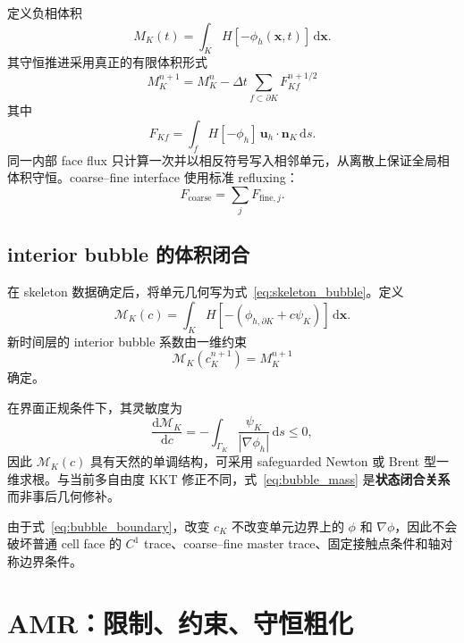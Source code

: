 \documentclass[11pt,a4paper]{ctexart}
\newcommand{\dd}{\mathrm{d}}
\newcommand{\bx}{\bm{x}}
\newcommand{\bu}{\bm{u}}
\newcommand{\bn}{\bm{n}}
\newcommand{\grad}{\nabla}
\begin{document}
定义负相体积
\begin{equation}
    M_K(t)=\int_K H[-\phi_h(\bx,t)]\,\dd\bx.
\end{equation}
其守恒推进采用真正的有限体积形式
\begin{equation}
    \boxed{
    M_K^{n+1}
    =M_K^n-
    \Delta t\sum_{f\subset\partial K}F_{Kf}^{n+1/2}
    }
    \label{eq:fv_mass}
\end{equation}
其中
\begin{equation}
    F_{Kf}
    =\int_f H[-\phi_h]\,\bu_h\cdot\bn_K\,\dd s.
    \label{eq:phaseflux}
\end{equation}
同一内部 face flux 只计算一次并以相反符号写入相邻单元，从离散上保证全局相体积守恒。coarse--fine interface 使用标准 refluxing：
\begin{equation}
    F_{\mathrm{coarse}}
    =\sum_jF_{\mathrm{fine},j}.
    \label{eq:reflux}
\end{equation}

\subsection{interior bubble 的体积闭合}

在 skeleton 数据确定后，将单元几何写为式~\eqref{eq:skeleton_bubble}。定义
\begin{equation}
    \mathcal M_K(c)
    =\int_K H[-(\phi_{h,\partial K}+c\psi_K)]\,\dd\bx.
\end{equation}
新时间层的 interior bubble 系数由一维约束
\begin{equation}
    \boxed{
    \mathcal M_K(c_K^{n+1})=M_K^{n+1}
    }
    \label{eq:bubble_mass}
\end{equation}
确定。

在界面正规条件下，其灵敏度为
\begin{equation}
    \frac{\dd\mathcal M_K}{\dd c}
    =-
    \int_{\Gamma_K}
    \frac{\psi_K}{{|\grad\phi_h|}}\,\dd s
    \le 0,
    \label{eq:massmonotone}
\end{equation}
因此 $\mathcal M_K(c)$ 具有天然的单调结构，可采用 safeguarded Newton 或 Brent 型一维求根。与当前多自由度 KKT 修正不同，式~\eqref{eq:bubble_mass} 是\textbf{状态闭合关系}而非事后几何修补。

由于式~\eqref{eq:bubble_boundary}，改变 $c_K$ 不改变单元边界上的 $\phi$ 和 $\grad\phi$，因此不会破坏普通 cell face 的 $C^1$ trace、coarse--fine master trace、固定接触点条件和轴对称边界条件。

\section{AMR：限制、约束、守恒粗化}
\end{document}
